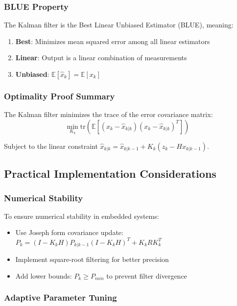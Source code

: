 \documentclass{article}
\begin{document}
\subsubsection{BLUE Property}

The Kalman filter is the Best Linear Unbiased Estimator (BLUE), meaning:
\begin{enumerate}
    \item \textbf{Best}: Minimizes mean squared error among all linear estimators
    \item \textbf{Linear}: Output is a linear combination of measurements
    \item \textbf{Unbiased}: $\mathbb{E}[\hat{x}_k] = \mathbb{E}[x_k]$
\end{enumerate}

\subsubsection{Optimality Proof Summary}

The Kalman filter minimizes the trace of the error covariance matrix:
\begin{equation}
\min_{K_k} \text{tr}(\mathbb{E}[(x_k - \hat{x}_{k|k})(x_k - \hat{x}_{k|k})^T])
\end{equation}

Subject to the linear constraint $\hat{x}_{k|k} = \hat{x}_{k|k-1} + K_k(z_k - H\hat{x}_{k|k-1})$.

\subsection{Practical Implementation Considerations}

\subsubsection{Numerical Stability}

To ensure numerical stability in embedded systems:
\begin{itemize}
    \item Use Joseph form covariance update: $P_k = (I-K_kH)P_{k|k-1}(I-K_kH)^T + K_kRK_k^T$
    \item Implement square-root filtering for better precision
    \item Add lower bounds: $P_k \geq P_{min}$ to prevent filter divergence
\end{itemize}

\subsubsection{Adaptive Parameter Tuning}
\end{document}
